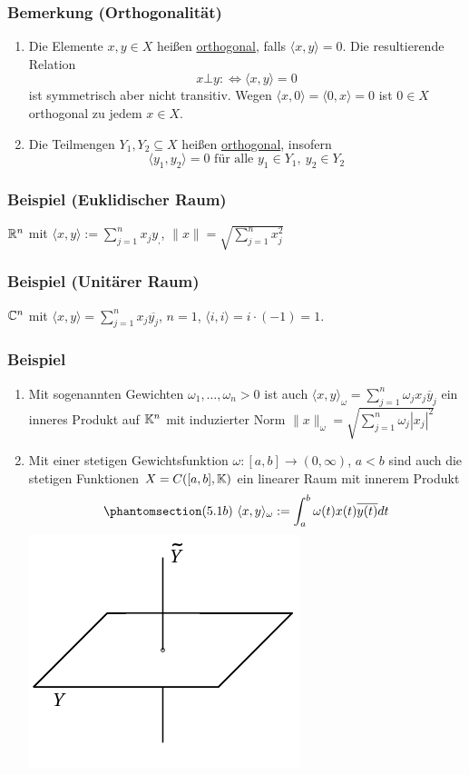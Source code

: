 \subsubsection{Bemerkung (Orthogonalität)}
\begin{enumerate}
\item Die Elemente $x,y\in X$ heißen \underline{orthogonal}, falls $\langle x,y\rangle=0$.  Die resultierende Relation 
\[x \bot y :\Leftrightarrow \langle x,y\rangle=0\]
ist symmetrisch aber nicht transitiv.  Wegen $\langle x,0\rangle=\langle0,x\rangle=0$ ist $0\in X$ orthogonal zu jedem $x\in X$.
\item Die Teilmengen $Y_1,Y_2\subseteq X$ heißen \underline{orthogonal}, insofern
\[\langle y_1,y_2\rangle=0\text{ für alle }y_1\in Y_1,\ y_2\in Y_2\]
\end{enumerate}
\subsubsection{Beispiel (Euklidischer Raum)}
$\mathbb{R} ^n$ mit $\langle x,y\rangle:=\sum _{j=1}^n x_jy_,$, $\|x\|=\sqrt{\sum _{j=1}^nx_j^2}$
\subsubsection{Beispiel (Unitärer Raum)}
$\mathbb{C} ^n$ mit $\langle x,y\rangle=\sum _{j=1}^n x_j \overline{y_j}$, $n=1$, $\langle i,i\rangle=i\cdot (-1)=1$.
\subsubsection{Beispiel}
\label{5.1.6}
\numbers
\begin{enumerate}
\item Mit sogenannten Gewichten $\omega_1,\dots,\omega_n>0$ ist auch $\langle x,y \rangle_\omega=\sum_{j=1}^n \omega_j x_j \overline{y}_j$ ein inneres Produkt auf $\mathbb{K}^n$ mit induzierter Norm $\|x\|_\omega= \sqrt{\sum_{j=1}^n \omega_j |x_j|^2}$
\item Mit einer stetigen Gewichtsfunktion $\omega:[a,b]\rightarrow(0,\infty)$, $a<b$ sind auch die stetigen Funktionen $X=C([a,b],\mathbb{K})$ ein linearer Raum mit innerem Produkt
\[\phantomsection\label{5.1b}(5.1b)\ \langle x, y\rangle_\omega:=\int_a^b \omega(t)x(t)\overline{y(t)}dt\]
\includegraphics[scale=0.4]{5-1-6.jpg}
\end{enumerate}
